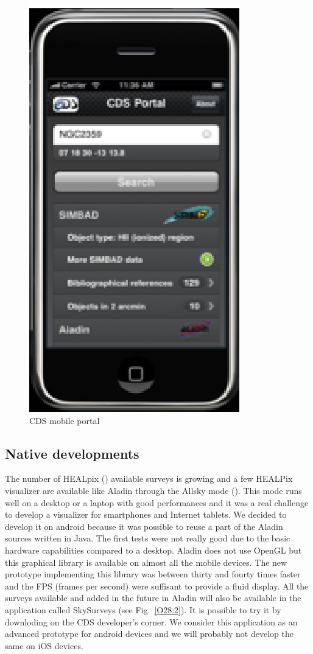\begin{figure}[h] \center
\includegraphics[scale=0.7]{part5/Schaaff_O28/O28_f4.eps}
\caption{CDS mobile portal} 
\label{O28:1}
\end{figure}

\subsection{Native developments}
The number of HEALpix (\citep{gorski_2005}) available surveys is growing and a few HEALPix visualizer are available like Aladin through the Allsky mode (\citep{fernique_2010}). This mode runs well on a desktop or a laptop with good performances and it was a real challenge to develop a visualizer for smartphones and Internet tablets. We decided to develop it on android because it was possible to reuse a part of the Aladin sources written in Java. The first tests were not really good due to the basic hardware capabilities compared to a desktop. Aladin does not use OpenGL but this graphical library is available on almost all the mobile devices. The new prototype implementing this library was between thirty and fourty times faster and the FPS (frames per second) were suffisant to provide a fluid display.
All the surveys available and added in the future in Aladin will also be available in the application called SkySurveys (see Fig.~\ref{O28:2}). It is possible to try it by downloding on the CDS developer's corner. 
We consider this application as an advanced prototype for android devices and we will probably not develop the same on iOS devices.

